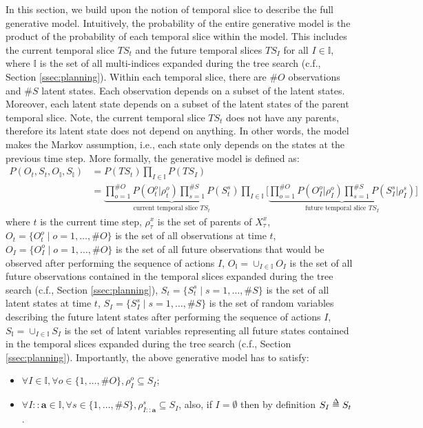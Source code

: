 \documentclass[twoside,11pt]{article}
\def\delequal{\mathrel{\ensurestackMath{\stackon[1pt]{=}{\scriptstyle\Delta}}}}
\newcommand{\nb}[1]{\# #1}
\begin{document}
In this section, we build upon the notion of temporal slice to describe the full generative model. Intuitively, the probability of the entire generative model is the product of the probability of each temporal slice within the model. This includes the current temporal slice $TS_t$ and the future temporal slices $TS_I$ for all $I \in \mathbb{I}$, where $\mathbb{I}$ is the set of all multi-indices expanded during the tree search (c.f., Section \ref{ssec:planning}). Within each temporal slice, there are $\nb{O}$ observations and $\nb{S}$ latent states. Each observation depends on a subset of the latent states. Moreover, each latent state depends on a subset of the latent states of the parent temporal slice. Note, the current temporal slice $TS_t$ does not have any parents, therefore its latent state does not depend on anything. In other words, the model makes the Markov assumption, i.e., each state only depends on the states at the previous time step. More formally, the generative model is defined as:
\begin{align*}
P(O_t,S_t,O_\mathbb{I},S_\mathbb{I}) &= P(TS_t) \prod_{I\in\mathbb{I}} P(TS_I)\\
&= \underbrace{\prod_{o=1}^{\nb{O}} P(O_t^o|\rho_t^o)\prod_{s=1}^{\nb{S}} P(S_t^s)}_{\text{current temporal slice }TS_t} \prod_{I\in\mathbb{I}} \Bigg[ \underbrace{\prod_{o=1}^{\nb{O}} P(O_I^o|\rho_I^o)\prod_{s=1}^{\nb{S}} P(S_I^s|\rho_I^s)}_{\text{future temporal slice }TS_I} \Bigg]
\end{align*}
where $t$ is the current time step, $\rho_\tau^x$ is the set of parents of $X^x_\tau$, $O_t = \{O_t^o \mid o = 1, \hdots, \nb{O}\}$ is the set of all observations at time $t$, $O_I = \{O_I^o \mid o = 1, \hdots, \nb{O}\}$ is the set of all future observations that would be observed after performing the sequence of actions $I$, $O_\mathbb{I} = \cup_{I \in \mathbb{I}} O_I$ is the set of all future observations contained in the temporal slices expanded during the tree search (c.f., Section \ref{ssec:planning}), $S_t = \{S_t^s \mid s = 1, \hdots, \nb{S}\}$ is the set of all latent states at time $t$, $S_I = \{S_I^s \mid s = 1, \hdots, \nb{S}\}$ is the set of random variables describing the future latent states after performing the sequence of actions $I$, $S_\mathbb{I} = \cup_{I \in \mathbb{I}} S_I$ is the set of latent variables representing all future states contained in the temporal slices expanded during the tree search (c.f., Section \ref{ssec:planning}). Importantly, the above generative model has to satisfy:
\begin{itemize}
\item $\forall I \in \mathbb{I}, \forall o \in \{1, \hdots, \nb{O}\}, \rho_I^o \subseteq S_I$;
\item $\forall I{::}\bm{a} \in \mathbb{I}, \forall s \in \{1, \hdots, \nb{S}\}, \rho_{I{::}\bm{a}}^s \subseteq S_I$, also, if $I = \emptyset$ then by definition $S_I \delequal S_t$.
\end{itemize}
\end{document}
